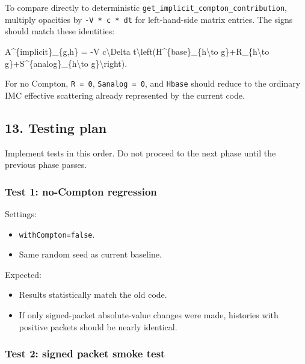 \documentclass[
]{article}
\newenvironment{Shaded}{}{}
\newcommand{\NormalTok}[1]{#1}
\providecommand{\tightlist}{%
  \setlength{\itemsep}{0pt}\setlength{\parskip}{0pt}}
\begin{document}
To compare directly to deterministic
\texttt{get\_implicit\_compton\_contribution}, multiply opacities by
\texttt{-V\ *\ c\ *\ dt} for left-hand-side matrix entries. The signs
should match these identities:

\begin{Shaded}
\begin{Highlighting}[]
\NormalTok{A\^{}\{implicit\}\_\{g,h\} = {-}V c\textbackslash{}Delta t\textbackslash{}left(H\^{}\{base\}\_\{h\textbackslash{}to g\}+R\_\{h\textbackslash{}to g\}+S\^{}\{analog\}\_\{h\textbackslash{}to g\}\textbackslash{}right).}
\end{Highlighting}
\end{Shaded}

For no Compton, \texttt{R\ =\ 0}, \texttt{Sanalog\ =\ 0}, and
\texttt{Hbase} should reduce to the ordinary IMC effective scattering
already represented by the current code.

\subsection{13. Testing plan}\label{testing-plan}

Implement tests in this order. Do not proceed to the next phase until
the previous phase passes.

\subsubsection{Test 1: no-Compton
regression}\label{test-1-no-compton-regression}

Settings:

\begin{itemize}
\tightlist
\item
  \texttt{withCompton=false}.
\item
  Same random seed as current baseline.
\end{itemize}

Expected:

\begin{itemize}
\tightlist
\item
  Results statistically match the old code.
\item
  If only signed-packet absolute-value changes were made, histories with
  positive packets should be nearly identical.
\end{itemize}

\subsubsection{Test 2: signed packet smoke
test}\label{test-2-signed-packet-smoke-test}
\end{document}
